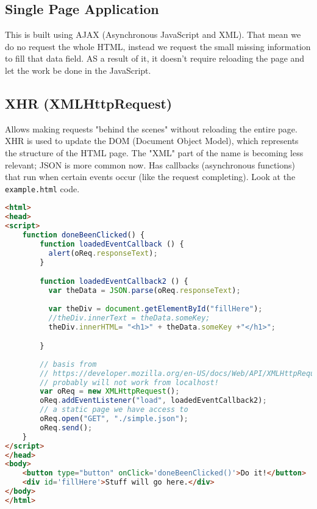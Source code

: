 \subsection{Single Page Application}
This is built using AJAX (Asynchronous JavaScript and XML). That mean we do no request the whole HTML, instead we request the small missing information to fill that data field. AS a result of it, it doesn't require reloading the page and let the work be done in the JavaScript. 

\subsection{XHR (XMLHttpRequest)}
Allows making requests "behind the scenes" without reloading the entire page. XHR is used to update the DOM (Document Object Model), which represents the structure of the HTML page. The "XML" part of the name is becoming less relevant; JSON is more common now. Has callbacks (asynchronous functions) that run when certain events occur (like the request completing). Look at the \texttt{example.html} code.

\begin{lstlisting}[language=html,caption=HTML]
<html>
<head>
<script> 
	function doneBeenClicked() { 
		function loadedEventCallback () {
          alert(oReq.responseText);
        }

        function loadedEventCallback2 () {
          var theData = JSON.parse(oReq.responseText);
          
          var theDiv = document.getElementById("fillHere");
          //theDiv.innerText = theData.someKey;
          theDiv.innerHTML= "<h1>" + theData.someKey +"</h1>";

        }
        
        // basis from
        // https://developer.mozilla.org/en-US/docs/Web/API/XMLHttpRequest/Using_XMLHttpRequest
        // probably will not work from localhost!
        var oReq = new XMLHttpRequest();
        oReq.addEventListener("load", loadedEventCallback2);
        // a static page we have access to
        oReq.open("GET", "./simple.json");
        oReq.send();
	}
</script>
</head>
<body>
    <button type="button" onClick='doneBeenClicked()'>Do it!</button>
    <div id='fillHere'>Stuff will go here.</div>
</body>
</html>	
\end{lstlisting}


